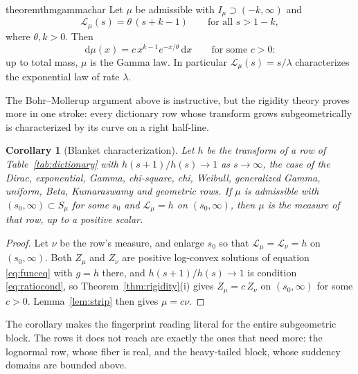 \documentclass[sn-mathphys-num]{sn-jnl}
\theoremstyle{thmstyleone}%
\newtheorem{corollary}{Corollary}%
\theoremstyle{thmstyletwo}%
\theoremstyle{thmstylethree}%
\theoremstyle{thmstyleone}%
\providecommand{\Leh}{\mathscr{L}}
\providecommand{\dd}{\,\mathrm{d}}
\begin{document}
	\begin{restatable}{theorem}{thmgammachar}\label{thm:gammachar}
		Let $\mu$ be admissible with $I_\mu\supset(-k,\infty)$ and
		\begin{equation}\label{eq:gammahyp}
			\Leh_\mu(s)=\theta\,(s+k-1)\qquad\text{for all }s>1-k,
		\end{equation}
		where $\theta,k>0$. Then
		\begin{equation}\label{eq:gammaconc}
			\dd\mu(x)=c\,x^{k-1}e^{-x/\theta}\dd x
			\qquad\text{for some }c>0 :
		\end{equation}
		up to total mass, $\mu$ is the Gamma law. In particular
		$\Leh_\mu(s)=s/\lambda$ characterizes the exponential law of rate
		$\lambda$.
	\end{restatable}
	
	The Bohr--Mollerup argument above is instructive, but the rigidity
	theory proves more in one stroke: every dictionary row whose
	transform grows subgeometrically is characterized by its curve on a
	right half-line.
	
	\begin{corollary}[Blanket characterization]\label{cor:charall}
		Let $h$ be the transform of a row of
		Table~\ref{tab:dictionary} with $h(s+1)/h(s)\to1$ as
		$s\to\infty$, the case of the Dirac, exponential, Gamma,
		chi-square, chi, Weibull, generalized Gamma, uniform, Beta,
		Kumaraswamy and geometric rows. If $\mu$ is admissible with
		$(s_0,\infty)\subset S_\mu$ for some $s_0$ and
		$\Leh_\mu=h$ on $(s_0,\infty)$, then $\mu$ is the measure of
		that row, up to a positive scalar.
	\end{corollary}
	
	\begin{proof}
		Let $\nu$ be the row's measure, and enlarge $s_0$ so that
		$\Leh_\mu=\Leh_\nu=h$ on $(s_0,\infty)$. Both $Z_\mu$ and
		$Z_\nu$ are positive log-convex solutions of equation
		\eqref{eq:funceq} with $g=h$ there, and $h(s+1)/h(s)\to1$ is
		condition \eqref{eq:ratiocond}, so
		Theorem~\ref{thm:rigidity}(i) gives $Z_\mu=c\,Z_\nu$ on
		$(s_0,\infty)$ for some $c>0$. Lemma~\ref{lem:strip} then
		gives $\mu=c\nu$.
	\end{proof}
	
	The corollary makes the fingerprint reading literal for the entire
	subgeometric block. The rows it does not reach are exactly the ones
	that need more: the lognormal row, whose fiber is real, and the
	heavy-tailed block, whose suddency domains are bounded above.
	
\end{document}
